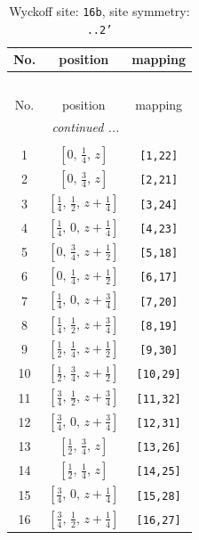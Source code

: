 \documentclass[fleqn,8pt]{jsarticle}
\begin{document}
\renewcommand{\arraystretch}{1.2}
\begin{longtable}{ccc}
\caption{Wyckoff site: {\tt 16b}, site symmetry: {\tt ..2'}}
 \\
 \hline \hline
No. & position & mapping \\ \hline \endfirsthead

\multicolumn{2}{l}{\tablename\ \thetable{}} \\
 \hline \hline
No. & position & mapping \\ \hline \endhead

 \hline \hline
\multicolumn{2}{r}{\footnotesize\it continued ...} \\ \endfoot

 \hline \hline
\multicolumn{2}{r}{} \\ \endlastfoot

1 & $\left[ 0,\, \frac{1}{4},\, z \right]$ & {\tt [1,22]} \\ \hline
2 & $\left[ 0,\, \frac{3}{4},\, z \right]$ & {\tt [2,21]} \\ \hline
3 & $\left[ \frac{1}{4},\, \frac{1}{2},\, z + \frac{1}{4} \right]$ & {\tt [3,24]} \\ \hline
4 & $\left[ \frac{1}{4},\, 0,\, z + \frac{1}{4} \right]$ & {\tt [4,23]} \\ \hline
5 & $\left[ 0,\, \frac{3}{4},\, z + \frac{1}{2} \right]$ & {\tt [5,18]} \\ \hline
6 & $\left[ 0,\, \frac{1}{4},\, z + \frac{1}{2} \right]$ & {\tt [6,17]} \\ \hline
7 & $\left[ \frac{1}{4},\, 0,\, z + \frac{3}{4} \right]$ & {\tt [7,20]} \\ \hline
8 & $\left[ \frac{1}{4},\, \frac{1}{2},\, z + \frac{3}{4} \right]$ & {\tt [8,19]} \\ \hline
9 & $\left[ \frac{1}{2},\, \frac{1}{4},\, z + \frac{1}{2} \right]$ & {\tt [9,30]} \\ \hline
10 & $\left[ \frac{1}{2},\, \frac{3}{4},\, z + \frac{1}{2} \right]$ & {\tt [10,29]} \\ \hline
11 & $\left[ \frac{3}{4},\, \frac{1}{2},\, z + \frac{3}{4} \right]$ & {\tt [11,32]} \\ \hline
12 & $\left[ \frac{3}{4},\, 0,\, z + \frac{3}{4} \right]$ & {\tt [12,31]} \\ \hline
13 & $\left[ \frac{1}{2},\, \frac{3}{4},\, z \right]$ & {\tt [13,26]} \\ \hline
14 & $\left[ \frac{1}{2},\, \frac{1}{4},\, z \right]$ & {\tt [14,25]} \\ \hline
15 & $\left[ \frac{3}{4},\, 0,\, z + \frac{1}{4} \right]$ & {\tt [15,28]} \\ \hline
16 & $\left[ \frac{3}{4},\, \frac{1}{2},\, z + \frac{1}{4} \right]$ & {\tt [16,27]} \\
\end{longtable}
\end{document}
